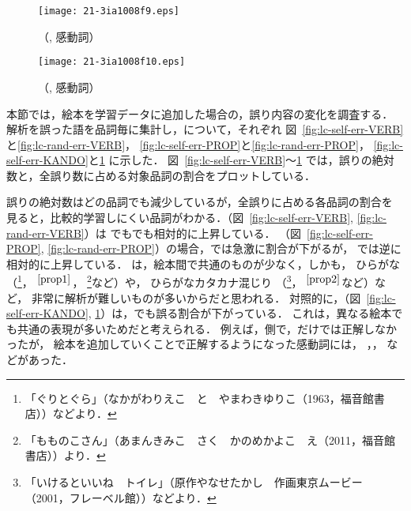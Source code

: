 \documentclass[japanese]{jnlp_1.4}
\newcommand{\kodomo}{}
\newcommand{\random}{}
\newcommand{\bestHINOKI}{}
\newcommand{\pos}[1]{}
\begin{document}
\begin{figure}[t]
 \begin{minipage}{0.48\hsize}
   \begin{center}
    \texttt{[image: 21-3ia1008f9.eps]}
   \end{center}
  \caption{\COM（\kodomo, 感動詞）}
   \label{fig:lc-self-err-KANDO}
 \end{minipage}
\hfill
 \begin{minipage}{0.48\hsize}
   \begin{center}
    \texttt{[image: 21-3ia1008f10.eps]}
   \end{center}
  \caption{\COM（\random, 感動詞）}
   \label{fig:lc-rand-err-KANDO}
 \end{minipage}
\end{figure}

本節では，絵本を学習データに追加した場合の，誤り内容の変化を調査する．
解析を誤った語を品詞毎に集計し，\pos{動詞}\pos{名詞-固有名詞}\pos{感動詞}について，それぞれ
図~\ref{fig:lc-self-err-VERB}と\ref{fig:lc-rand-err-VERB}，
\ref{fig:lc-self-err-PROP}と\ref{fig:lc-rand-err-PROP}，
\ref{fig:lc-self-err-KANDO}と\ref{fig:lc-rand-err-KANDO}
に示した．
図~\ref{fig:lc-self-err-VERB}〜\ref{fig:lc-rand-err-KANDO}
では，誤りの絶対数と，全誤り数に占める対象品詞の割合をプロットしている．

誤りの絶対数はどの品詞でも減少しているが，全誤りに占める各品詞の割合を
見ると，比較的学習しにくい品詞がわかる．\pos{動詞}（図~\ref{fig:lc-self-err-VERB}, \ref{fig:lc-rand-err-VERB}）は
\kodomo でも\random でも相対的に上昇している．
\pos{固有名詞}（図~\ref{fig:lc-self-err-PROP}, \ref{fig:lc-rand-err-PROP}）の場合，\kodomo では急激に割合が下がるが，
\random では逆に相対的に上昇している．
\pos{固有名詞}は，絵本間で共通のものが少なく，しかも，
ひらがな（\mbox{\jpn[ぐり]{}}\footnote{\label{prop1}「ぐりとぐら」（なかがわりえこ　と　やまわきゆりこ（1963，福音館書店））などより．}，
\jpn[ぐら]{}$^{\ref{prop1}}$，
\jpn[もものこ]{}\footnote{「もものこさん」（あまんきみこ　さく　かのめかよこ　え（2011，福音館書店））より．}など）や，
ひらがなカタカナ混じり
（\jpn[ウサこ]{}\footnote{\label{prop2}「いけるといいね　トイレ」（原作やなせたかし　作画東京ムービー（2001，フレーベル館））などより．}，
\jpn[ネコみ]{}$^{\ref{prop2}}$など）など，
非常に解析が難しいものが多いからだと思われる．
対照的に，\pos{感動詞}（図~\ref{fig:lc-self-err-KANDO}, \ref{fig:lc-rand-err-KANDO}）は，\random でも誤る割合が下がっている．
これは，異なる絵本でも共通の表現が多いためだと考えられる．
例えば，\random 側で，\bestHINOKI だけでは正解しなかったが，
絵本を追加していくことで正解するようになった感動詞には，
\jpn[あっぷっぷ]{}，\jpn[ごくろうさま]{}，
\mbox{\jpn[ギャオー]{}}などがあった．
\end{document}
